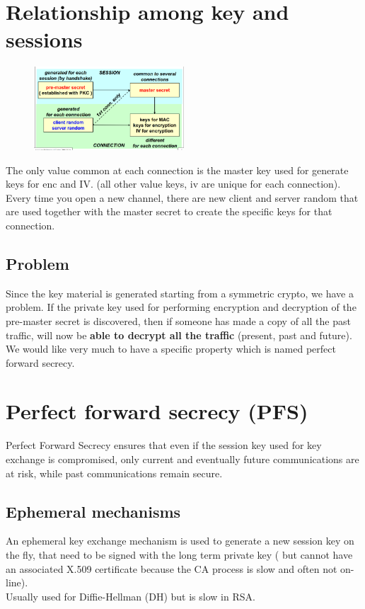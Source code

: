 \section{Relationship among key and sessions}

\begin{figure}[ht]
    \centering
    \includegraphics[width=0.5\textwidth]{img/key_sess.png}
    \label{fig:key_session}
\end{figure}

The only value common at each connection is the master key used for generate keys for enc and IV.
(all other value keys, iv are unique for each connection). \\
Every time you open a new channel, there are new client and server random that are used together with the master secret to create the specific keys for that connection.

\subsection{Problem}
Since the key material is generated starting from a symmetric crypto, we have a problem. If the private key used for performing encryption and decryption of the pre-master secret is discovered, then if someone has made a copy of all the past traffic, will now be \textbf{able to decrypt all the traffic} (present, past and future). \\
We would like very much to have a specific property which is named perfect forward secrecy.

\section{Perfect forward secrecy (PFS)}
Perfect Forward Secrecy ensures that even if the session key used for key exchange is compromised, only current and eventually future communications are at risk, while past communications remain secure.

\subsection{Ephemeral mechanisms}
An ephemeral key exchange mechanism is used to generate a new session key on the fly, that need to be signed with the long term private key ( but cannot have an associated X.509 certificate because the CA process is slow and often not on-line). \\ Usually used for Diffie-Hellman (DH) but is slow in RSA. \\

